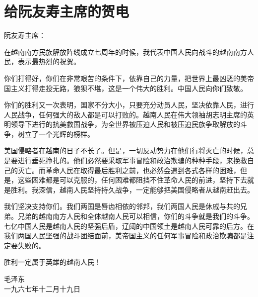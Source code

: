 \section[给阮友寿主席的贺电（一九六七年十二月十九日）]{给阮友寿主席的贺电}


阮友寿主席：

在越南南方民族解放阵线成立七周年的时候，我代表中国人民向战斗的越南南方人民，表示最热烈的祝贺。

你们打得好，你们在非常艰苦的条件下，依靠自己的力量，把世界上最凶恶的美帝国主义打得走投无路，狼狈不堪，这是一个伟大的胜利。中国人民向你们致敬。

你们的胜利又一次表明，国家不分大小，只要充分动员人民，坚决依靠人民，进行人民战争，任何强大的敌人都是可以打败的。越南人民在伟大领袖胡志明主席的英明领导下进行的抗美救国战争，为全世界被压迫人民和被压迫民族争取解放的斗争，树立了一个光辉的榜样。

美国侵略者在越南的日子不长了。但是，一切反动势力在他们行将灭亡的时候，总是要进行垂死挣扎的。他们必然要采取军事冒险和政治欺骗的种种手段，来挽救自己的灭亡。而革命人民在取得最后胜利之前，也必然会遇到各式各样的困难，但是，这些困难都是可以克服的，任何困难都阻挡不住革命人民的前进，坚持下去就是胜利。我深信，越南人民坚持持久战争，一定能够把美国侵略者从越南赶出去。

我们坚决支持你们。我们两国是唇齿相依的邻邦，我们两国人民是休戚与共的兄弟。兄弟的越南南方人民和全体越南人民可以相信，你们的斗争就是我们的斗争。七亿中国人民是越南人民的坚强后盾，辽阔的中国领土是越南人民可靠的后方。在我们两国人民坚强的战斗团结面前，美帝国主义的任何军事冒险和政治欺骗都是注定要失败的。

胜利一定属于英雄的越南人民！
{\raggedleft 毛泽东\\一九六七年十二月十九日\par}


